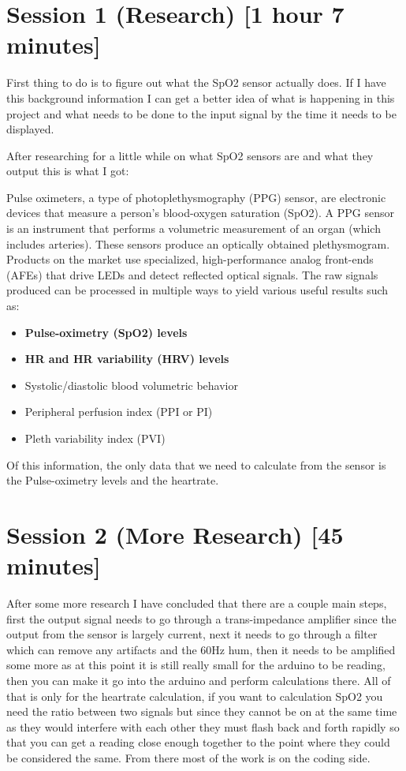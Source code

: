 \documentclass{article}
\begin{document}
\tableofcontents
\newpage
\section{Session 1 (Research) [1 hour 7 minutes]}
First thing to do is to figure out what the SpO2 sensor actually does. If I have this background information I can get a better idea of what is happening in this project and what needs to be done to the input signal by the time it needs to be displayed.

After researching for a little while on what SpO2 sensors are and what they output this is what I got:

Pulse oximeters, a type of photoplethysmography (PPG) sensor, are electronic devices that measure a person’s blood-oxygen saturation (SpO2). A PPG sensor is an instrument that performs a volumetric measurement of an organ (which includes arteries). These sensors produce an optically obtained plethysmogram. Products on the market use specialized, high-performance analog front-ends (AFEs) that drive LEDs and detect reflected optical signals. The raw signals produced can be processed in multiple ways to yield various useful results such as:
\begin{itemize}
    \item \textbf{Pulse-oximetry (SpO2) levels}
    \item \textbf{HR and HR variability (HRV) levels}
    \item Systolic/diastolic blood volumetric behavior
    \item Peripheral perfusion index (PPI or PI)
    \item Pleth variability index (PVI)
\end{itemize}
Of this information, the only data that we need to calculate from the sensor is the Pulse-oximetry levels and the heartrate.
\section{Session 2 (More Research) [45 minutes]}
After some more research I have concluded that there are a couple main steps, first the output signal needs to go through a trans-impedance amplifier since the output from the sensor is largely current, next it needs to go through a filter which can remove any artifacts and the 60Hz hum, then it needs to be amplified some more as at this point it is still really small for the arduino to be reading, then you can make it go into the arduino and perform calculations there. All of that is only for the heartrate calculation, if you want to calculation SpO2 you need the ratio between two signals but since they cannot be on at the same time as they would interfere with each other they must flash back and forth rapidly so that you can get a reading close enough together to the point where they could be considered the same. From there most of the work is on the coding side.
\end{document}
